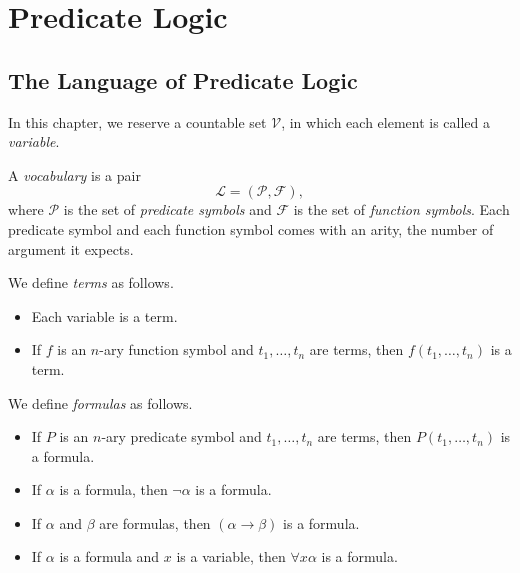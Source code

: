 \chapter{Predicate Logic}
\section{The Language of Predicate Logic}
In this chapter, we reserve a countable set $\mathcal{V}$, in which each
element is called a \emph{variable}.

\begin{definition}
  A \emph{vocabulary} is a pair
  \begin{equation*}
    \mathcal{L} = (\mathcal{P}, \mathcal{F}),
  \end{equation*}
  where $\mathcal{P}$ is the set of \emph{predicate symbols} and $\mathcal{F}$
  is the set of \emph{function symbols}.
  Each predicate symbol and each function symbol comes with an arity, the
  number of argument it expects.
\end{definition}

\begin{definition}
  We define \emph{terms} as follows.
  \begin{itemize}
    \item Each variable is a term.
    \item If $f$ is an $n$-ary function symbol and $t_1, \dots, t_n$ are terms,
    then $f(t_1, \dots, t_n)$ is a term.
  \end{itemize}
\end{definition}

\begin{definition}
  We define \emph{formulas} as follows.
  \begin{itemize}
    \item If $P$ is an $n$-ary predicate symbol and $t_1, \dots, t_n$ are
    terms, then $P(t_1, \dots, t_n)$ is a formula.
    \item If $\alpha$ is a formula, then $\neg\alpha$ is a formula.
    \item If $\alpha$ and $\beta$ are formulas, then $(\alpha \to \beta)$ is a
    formula.
    \item If $\alpha$ is a formula and $x$ is a variable, then
    $\forall x \alpha$ is a formula.
  \end{itemize}
\end{definition}

